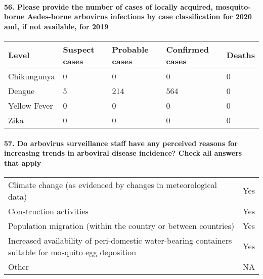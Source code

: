 \documentclass[
]{article}
\begin{document}
\hypertarget{please-provide-the-number-of-cases-of-locally-acquired-mosquito-borne-aedes-borne-arbovirus-infections-by-case-classification-for-2020-and-if-not-available-for-2019}{%
\paragraph{56. Please provide the number of cases of locally acquired,
mosquito-borne Aedes-borne arbovirus infections by case classification
for 2020 and, if not available, for
2019}\label{please-provide-the-number-of-cases-of-locally-acquired-mosquito-borne-aedes-borne-arbovirus-infections-by-case-classification-for-2020-and-if-not-available-for-2019}}

\begin{longtable}[]{@{}lllll@{}}
\toprule
Level & Suspect cases & Probable cases & Confirmed cases & Deaths \\
\midrule
\endhead
Chikungunya & 0 & 0 & 0 & 0 \\
Dengue & 5 & 214 & 564 & 0 \\
Yellow Fever & 0 & 0 & 0 & 0 \\
Zika & 0 & 0 & 0 & 0 \\
\bottomrule
\end{longtable}

\hypertarget{do-arbovirus-surveillance-staff-have-any-perceived-reasons-for-increasing-trends-in-arboviral-disease-incidence-check-all-answers-that-apply}{%
\paragraph{57. Do arbovirus surveillance staff have any perceived
reasons for increasing trends in arboviral disease incidence? Check all
answers that
apply}\label{do-arbovirus-surveillance-staff-have-any-perceived-reasons-for-increasing-trends-in-arboviral-disease-incidence-check-all-answers-that-apply}}

\begin{longtable}[]{@{}
  >{\raggedright\arraybackslash}p{}
  >{\raggedright\arraybackslash}p{}@{}}
\toprule
\endhead
Climate change (as evidenced by changes in meteorological data) & Yes \\
Construction activities & Yes \\
Population migration (within the country or between countries) & Yes \\
Increased availability of peri-domestic water-bearing containers
suitable for mosquito egg deposition & Yes \\
Other & NA \\
\bottomrule
\end{longtable}
\end{document}
